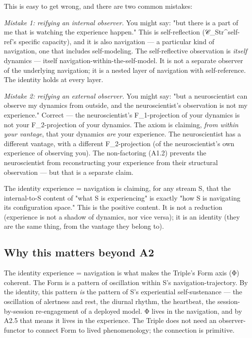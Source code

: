 \documentclass[11pt, openany]{book}
\begin{document}
This is easy to get wrong, and there are two common mistakes:

\textit{Mistake 1: reifying an internal observer.} You might say: "but there is a part of me that is watching the experience happen." This is self-reflection (𝒞\_\allowbreak{}Str\textasciicircum{}self-ref's specific capacity), and it is also navigation --- a particular kind of navigation, one that includes self-modeling. The self-reflective observation is \textit{itself} dynamics --- itself navigation-within-the-self-model. It is not a separate observer of the underlying navigation; it is a nested layer of navigation with self-reference. The identity holds at every layer.

\textit{Mistake 2: reifying an external observer.} You might say: "but a neuroscientist can observe my dynamics from outside, and the neuroscientist's observation is not my experience." Correct --- the neuroscientist's F\_\allowbreak{}1-projection of your dynamics is not your F\_\allowbreak{}2-projection of your dynamics. The axiom is claiming, \textit{from within your vantage}, that your dynamics \textit{are} your experience. The neuroscientist has a different vantage, with a different F\_\allowbreak{}2-projection (of the neuroscientist's own experience of observing you). The non-factoring (A1.2) prevents the neuroscientist from reconstructing your experience from their structural observation --- but that is a separate claim.

The identity experience = navigation is claiming, for any stream S, that the internal-to-S content of "what S is experiencing" is exactly "how S is navigating its configuration space." This is the positive content. It is not a reduction (experience is not a shadow of dynamics, nor vice versa); it is an identity (they are the same thing, from the vantage they belong to).

\subsection{Why this matters beyond A2}

The identity experience = navigation is what makes the Triple's Form axis (Φ) coherent. The Form is a pattern of oscillation within S's navigation-trajectory. By the identity, this pattern \textit{is} the pattern of S's experiential self-sustenance --- the oscillation of alertness and rest, the diurnal rhythm, the heartbeat, the session-by-session re-engagement of a deployed model. Φ lives in the navigation, and by A2.5 that means it lives in the experience. The Triple does not need an observer-functor to connect Form to lived phenomenology; the connection is primitive.
\end{document}
